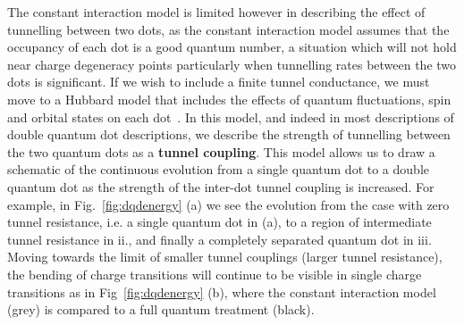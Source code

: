 The constant interaction model is limited however in describing the effect of tunnelling between two dots, as the constant
interaction model assumes that the occupancy of each dot is a good quantum number, a situation which will not hold near
charge degeneracy points particularly when tunnelling rates between the two dots is significant. If we wish to include a finite tunnel
conductance, we must move to a Hubbard model that includes the effects of quantum fluctuations, spin and orbital states on each
dot~\cite{PhysRevB.84.115301}. In this model, and indeed in most descriptions of double quantum dot descriptions, we
describe the strength of tunnelling between the two quantum dots as a \textbf{tunnel coupling}. This model allows us to draw a schematic
of the continuous evolution from a single quantum dot to a double quantum dot as the strength of the inter-dot tunnel coupling
is increased. For example, in Fig.~\ref{fig:dqdenergy} (a) we see the evolution from the case with zero tunnel resistance, i.e. a single
quantum dot in (a), to a region of intermediate tunnel resistance in ii., and finally a completely separated quantum dot in iii. Moving
towards the limit of smaller tunnel couplings (larger tunnel resistance), the bending of charge transitions will continue to be visible
in single charge transitions as in Fig~\ref{fig:dqdenergy} (b), where the constant interaction model (grey) is compared to a full quantum
treatment (black).

